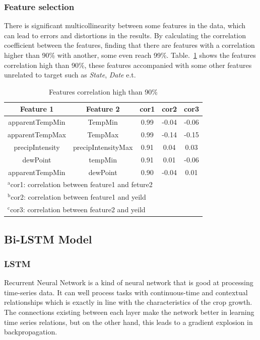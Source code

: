 \documentclass[conference]{IEEEtran}
\begin{document}
    \subsubsection{Feature selection}
      There is significant multicollinearity between some features in the data, which can lead to errors and distortions in the results\cite{farrar1967multicollinearity}. By calculating the correlation coefficient between the features, finding that there are features with a correlation higher than 90\% with another, some even reach 99\%. Table.~\ref{tab:correlation} shows the features correlation high than 90\%, these features accompanied with some other features unrelated to target such as \textit{State}, \textit{Date} e.t.
      \begin{table}[htbp]
        \caption{Features correlation high than 90\%}
        \begin{center}
          \begin{tabular}{|c|c|c|c|c|}
            \hline
            Feature 1 & Feature 2 & cor1 & cor2 & cor3\\
            \hline
            apparentTempMin & TempMin     & 0.99 & -0.04 & -0.06 \\
            apparentTempMax & TempMax     & 0.99 & -0.14 & -0.15 \\
            precipIntensity & precipIntensityMax & 0.91 & 0.04  & 0.03  \\
            dewPoint & tempMin & 0.91 & 0.01  & -0.06 \\
            apparentTempMin & dewPoint & 0.90 & -0.04 & 0.01 \\
            \hline
            \multicolumn{5}{l}{$^{\mathrm{a}}$cor1: correlation between feature1 and feture2} \\
            \multicolumn{5}{l}{$^{\mathrm{b}}$cor2: correlation between feature1 and yeild} \\ 
            \multicolumn{5}{l}{$^{\mathrm{c}}$cor3: correlation between feature2 and yeild} \\
          \end{tabular}
          \label{tab:correlation}
        \end{center}
      \end{table}




  \subsection{Bi-LSTM Model}
    \subsubsection{LSTM}
      Recurrent Neural Network is a kind of neural network that is good at processing time-series data. It can well process tasks with continuous-time and contextual relationships which is exactly in line with the characteristics of the crop growth. The connections existing between each layer make the network better in learning time series relations, but on the other hand, this leads to a gradient explosion in backpropagation. \cite{hochreiter1997long}
\end{document}
